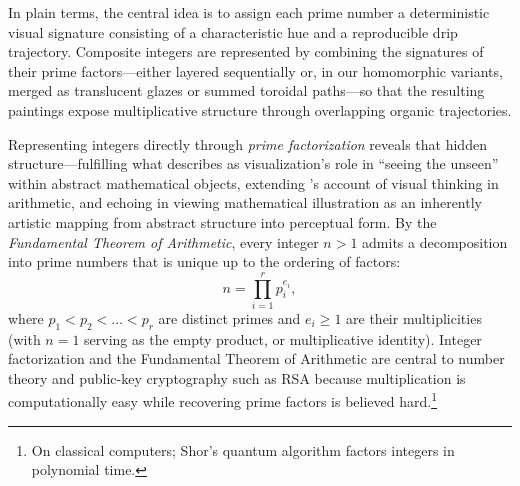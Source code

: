 \documentclass[]{interact}
\theoremstyle{plain}
\theoremstyle{definition}
\theoremstyle{remark}
\begin{document}
In plain terms, the central idea is to assign each prime number a deterministic visual signature consisting of a characteristic hue and a reproducible drip trajectory. Composite integers are represented by combining the signatures of their prime factors—either layered sequentially or, in our homomorphic variants, merged as translucent glazes or summed toroidal paths—so that the resulting paintings expose multiplicative structure through overlapping organic trajectories.

Representing integers directly through \emph{prime factorization} reveals that hidden structure—fulfilling what \citet{arcavi2003role} describes as visualization's role in ``seeing the unseen'' within abstract mathematical objects, extending \citeauthor{giaquinto2007visual}'s \citeyearpar{giaquinto2007visual} account of visual thinking in arithmetic, and echoing \citet{harriss2022art} in viewing mathematical illustration as an inherently artistic mapping from abstract structure into perceptual form. By the \emph{Fundamental Theorem of Arithmetic}, every integer $n > 1$ admits a decomposition into prime numbers that is unique up to the ordering of factors:
\[
  n = \prod_{i=1}^{r} p_i^{e_i},
\]
where $p_1 < p_2 < \dots < p_r$ are distinct primes and $e_i \ge 1$ are their multiplicities (with $n = 1$ serving as the empty product, or multiplicative identity). Integer factorization and the Fundamental Theorem of Arithmetic are central to number theory \citep{hardy2008introduction} and public-key cryptography such as RSA \citep{rivest1978method} because multiplication is computationally easy while recovering prime factors is believed hard.\footnote{On classical computers; Shor's quantum algorithm factors integers in polynomial time.}
\end{document}
